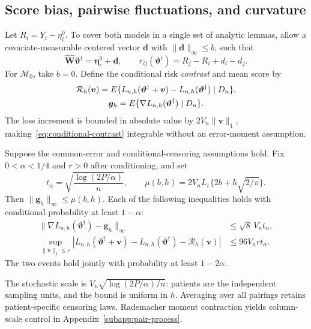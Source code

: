\subsection{Score bias, pairwise fluctuations, and curvature}
\label{subsec:theory-lemmas}
Let $R_i=Y_i-\eta_i^0$. To cover both models in a single set of analytic lemmas, allow a covariate-measurable centered vector $\mathbf d$ with $\|\mathbf d\|_\infty\le b$, such that
\[
 \widehat{\bm{W}}\bm{\vartheta}^\dagger=\bm{\eta}_c^0+\mathbf d,
 \qquad r_{ij}(\bm{\vartheta}^\dagger)=R_j-R_i+d_i-d_j.
\]
For $\mathcal M_0$, take $b=0$. Define the conditional risk \emph{contrast} and mean score by
\begin{equation}
 \begin{gathered}
\mathcal R_h(\bm{v})=E\{L_{n,h}(\bm{\vartheta}^\dagger+\bm{v})-L_{n,h}(\bm{\vartheta}^\dagger)
                    \mid\mathcal \bm{D}_n\},\\
 \bm{g}_h=E\{\nabla L_{n,h}(\bm{\vartheta}^\dagger)\mid\mathcal \bm{D}_n\}.
 \end{gathered}
 \label{eq:conditional-contrast}
\end{equation}
The loss increment is bounded in absolute value by $2V_n\|\bm{v}\|_1$, making~\eqref{eq:conditional-contrast} integrable without an error-moment assumption.

\begin{lemma}
\label{lem:conditional-process}
Suppose the common-error and conditional-censoring assumptions hold. Fix $0<\alpha<1/4$ and $r>0$ after conditioning, and set
\begin{equation}
 t_\alpha=\sqrt{\frac{\log(2P/\alpha)}n},\qquad
 \mu(b,h)=2V_nL_\varepsilon\{2b+h\sqrt{2/\pi}\}.
 \label{eq:theory-score-level}
\end{equation}
Then $\|\bm{g}_h\|_\infty\le\mu(b,h)$. Each of the following inequalities holds with conditional probability at least $1-\alpha$:
\begin{align}
 \|\nabla L_{n,h}(\bm{\vartheta}^\dagger)-\bm{g}_h\|_\infty
       &\le\sqrt8\,V_nt_\alpha, \label{eq:score-deviation}\\
 \sup_{\|\bm{v}\|_1\le r}
 |L_{n,h}(\bm{\vartheta}^\dagger+\bm{v})-L_{n,h}(\bm{\vartheta}^\dagger)-\mathcal R_h(\bm{v})|
       &\le96V_nrt_\alpha. \label{eq:contrast-deviation}
\end{align}
The two events hold jointly with probability at least $1-2\alpha$.
\end{lemma}
The stochastic scale is $V_n\sqrt{\log(2P/\alpha)/n}$: patients are the independent sampling units, and the bound is uniform in $h$. Averaging over all pairings retains patient-specific censoring laws. Rademacher moment contraction \citep{ClemencconEtAl2008,LedouxTalagrand1991} yields column-scale control in Appendix~\ref{subapp:pair-process}.

